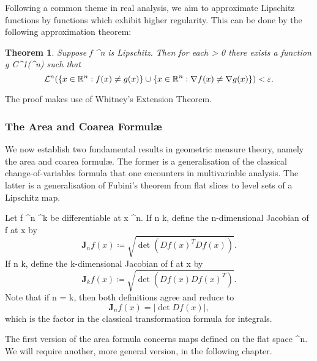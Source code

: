 \documentclass[a4paper, 11pt]{article}
\theoremstyle{plain}
\newtheorem{theorem}{Theorem}[section]
\theoremstyle{definition}
\theoremstyle{remark}
\numberwithin{equation}{subsection}
\def\({}
\def\){}
\begin{document}
Following a common theme in real analysis, we aim to approximate Lipschitz functions by functions which exhibit higher regularity. This can be done by the following approximation theorem:


\begin{theorem}
Suppose \(f \vcentcolon {}^n \rightarrow {}\) is Lipschitz. Then for each \(\varepsilon > 0\) there exists a function \(g \in C^1(^n)\) such that
\begin{equation}
\mathcal{L}^n(\{x \in \mathbb{R}^n \vcentcolon f(x) \neq g(x)\} \cup \{x \in \mathbb{R}^n \vcentcolon \nabla f(x) \neq \nabla g(x)\}) < \varepsilon.
\end{equation}
\end{theorem}

The proof makes use of Whitney's Extension Theorem.

\subsubsection{The Area and Coarea Formul\ae}

We now establish two fundamental results in geometric measure theory, namely the area and coarea formul\ae. The former is a generalisation of the classical change-of-variables formula that one encounters in multivariable analysis. The latter is a generalisation of Fubini's theorem from flat slices to level sets of a Lipschitz map.

Let \(f \vcentcolon {}^n \rightarrow {}^k\) be differentiable at \(x \in {}^n\). If \(n \leqslant k\), define the \(n\)-dimensional Jacobian of \(f\) at \(x\) by
\begin{equation}
\mathbf{J}_{n}f(x) \coloneq \sqrt{\det(Df(x)^{T}Df(x))}.
\end{equation}
If \(n \geqslant k\), define the \(k\)-dimensional Jacobian of \(f\) at \(x\) by
\begin{equation}
\mathbf{J}_{k}f(x) \coloneq \sqrt{\det(Df(x)Df(x)^{T})}.
\end{equation}
Note that if \(n = k\), then both definitions agree and reduce to
\begin{equation}
\mathbf{J}_{n}f(x) = \vert \det Df(x) \vert,
\end{equation}
which is the factor in the classical transformation formula for integrals.

The first version of the area formula concerns maps defined on the flat space \(^n\). We will require another, more general version, in the following chapter.
\end{document}
